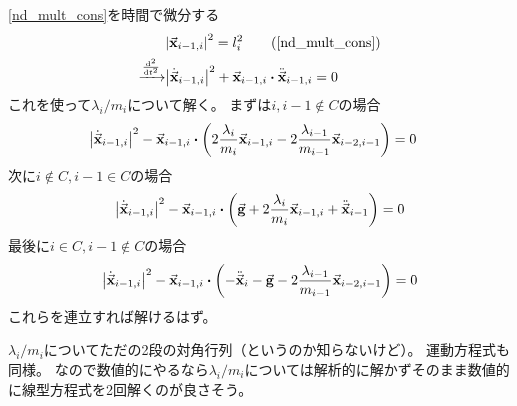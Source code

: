 \documentclass[uplatex]{jsarticle}
\begin{document}
\eqref{nd_mult_cons}を時間で微分する
\begin{align}
    & \abs{\va{x}_{i-1,i}}^2 = l_i^2 \tag{\ref{nd_mult_cons}} \\
    \xrightarrow{\dv[2]{}{t}} &
    \abs{\dot{\va{x}}_{i-1,i}}^2 + \va{x}_{i-1,i} \vdot \ddot{\va{x}}_{i-1,i} = 0
\end{align}
これを使って$\lambda_i/m_i$について解く。
まずは$i, i-1 \notin C$の場合
\begin{align}
    &\abs{\dot{\va{x}}_{i-1,i}}^2 - \va{x}_{i-1,i} \vdot \qty(2\frac{\lambda_i}{m_i} \va{x}_{i-1,i} -  2\frac{\lambda_{i-1}}{m_{i-1}} \va{x}_{i-2,i-1}) = 0
\end{align}
次に$i \notin C, i-1 \in C$の場合
\begin{align}
    \abs{\dot{\va{x}}_{i-1,i}}^2 - \va{x}_{i-1,i} \vdot \qty(\va{g} + 2\frac{\lambda_i}{m_i} \va{x}_{i-1,i} + \ddot{\va{x}}_{i-1}) = 0 \label{ng_multi_lambda2}
\end{align}
最後に$i \in C, i-1 \notin C$の場合
\begin{align}
    \abs{\dot{\va{x}}_{i-1,i}}^2 - \va{x}_{i-1,i} \vdot \qty(-\ddot{\va{x}}_i - \va{g} - 2\frac{\lambda_{i-1}}{m_{i-1}} \va{x}_{i-2,i-1}) = 0
\end{align}
これらを連立すれば解けるはず。

$\lambda_i/m_i$についてただの2段の対角行列（というのか知らないけど）。
運動方程式も同様。
なので数値的にやるなら$\lambda_i/m_i$については解析的に解かずそのまま数値的に線型方程式を2回解くのが良さそう。
\end{document}
